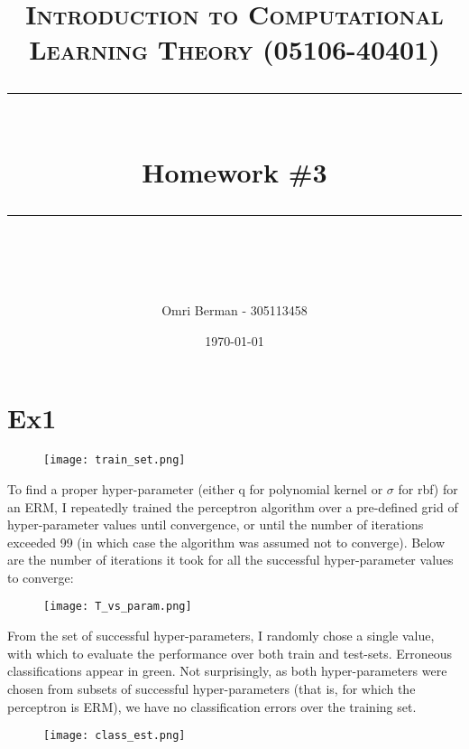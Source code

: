 \documentclass{article} %
\title{
\normalfont \normalsize 
\textsc{Introduction to Computational Learning Theory (05106-40401)} \\
[10pt] 
\rule{\linewidth}{0.5pt} \\[6pt] 
\huge Homework \#3 \\
\rule{\linewidth}{2pt}  \\[10pt]
}
\author{Omri Berman - 305113458}
\date{\normalsize \today}
\begin{document}
\maketitle
\noindent

\section*{Ex1}

\begin{figure}[h]
    \texttt{[image: train\_set.png]}
\end{figure}

To find a proper hyper-parameter (either q for polynomial kernel or $\sigma$ for rbf) for an ERM, I repeatedly trained the perceptron algorithm over a pre-defined grid of hyper-parameter values until convergence, or until the number of iterations exceeded 99 (in which case the algorithm was assumed not to converge). Below are the number of iterations it took for all the successful hyper-parameter values to converge:

\begin{figure}[h]
    \texttt{[image: T\_vs\_param.png]}
\end{figure}

From the set of successful hyper-parameters, I randomly chose a single value, with which to evaluate the performance over both train and test-sets. Erroneous classifications appear in green.
Not surprisingly, as both hyper-parameters were chosen from subsets of successful hyper-parameters (that is, for which the perceptron is ERM), we have no classification errors over the training set.

\begin{figure}[h]
    \texttt{[image: class\_est.png]}
\end{figure}

\begin{center}
\end{center}
\end{document}
